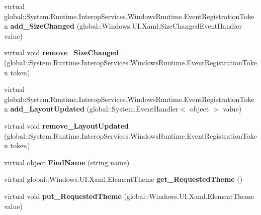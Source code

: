 \begin{DoxyCompactItemize}
virtual global\+::\+System.\+Runtime.\+Interop\+Services.\+Windows\+Runtime.\+Event\+Registration\+Token {\bfseries add\+\_\+\+Size\+Changed} (global\+::\+Windows.\+U\+I.\+Xaml.\+Size\+Changed\+Event\+Handler value)
\item 
\mbox{\label{class_windows_1_1_u_i_1_1_xaml_1_1_framework_element_aaa081b6b6e5a8977b1313e24490fd535}} 
virtual void {\bfseries remove\+\_\+\+Size\+Changed} (global\+::\+System.\+Runtime.\+Interop\+Services.\+Windows\+Runtime.\+Event\+Registration\+Token token)
\item 
\mbox{\label{class_windows_1_1_u_i_1_1_xaml_1_1_framework_element_a35323395e299a529e632a7801be6c440}} 
virtual global\+::\+System.\+Runtime.\+Interop\+Services.\+Windows\+Runtime.\+Event\+Registration\+Token {\bfseries add\+\_\+\+Layout\+Updated} (global\+::\+System.\+Event\+Handler$<$ object $>$ value)
\item 
\mbox{\label{class_windows_1_1_u_i_1_1_xaml_1_1_framework_element_a845b16fd198b79d626c5059bbe7859fe}} 
virtual void {\bfseries remove\+\_\+\+Layout\+Updated} (global\+::\+System.\+Runtime.\+Interop\+Services.\+Windows\+Runtime.\+Event\+Registration\+Token token)
\item 
\mbox{\label{class_windows_1_1_u_i_1_1_xaml_1_1_framework_element_a6b612b2e8b522c30e02387f5aa3236a4}} 
virtual object {\bfseries Find\+Name} (string name)
\item 
\mbox{\label{class_windows_1_1_u_i_1_1_xaml_1_1_framework_element_a59026d5b9db13dbfef26e454cd2d1b90}} 
virtual global\+::\+Windows.\+U\+I.\+Xaml.\+Element\+Theme {\bfseries get\+\_\+\+Requested\+Theme} ()
\item 
\mbox{\label{class_windows_1_1_u_i_1_1_xaml_1_1_framework_element_a5e940cb28f70daaf9fd01a0e738290a2}} 
virtual void {\bfseries put\+\_\+\+Requested\+Theme} (global\+::\+Windows.\+U\+I.\+Xaml.\+Element\+Theme value)
\item 
\mbox{\label{class_windows_1_1_u_i_1_1_xaml_1_1_framework_element_a10e46700c2e4f78a1116716f792f6381}} 

\end{DoxyCompactItemize}
